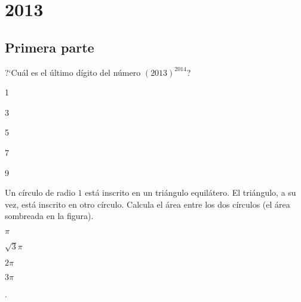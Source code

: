 \chapter{2013}
\label{cha:2013}

\section{Primera parte}
\label{sec:primera-parte2013}

\begin{Problema}{1}
  ?`Cu\'al es el \'ultimo d\'igito del n\'umero $(2013)^{2014}$?

  \begin{inparaenum}
  \item 1 \espl
  \item 3 \espl
  \item 5 \espl
  \item 7 \espl
  \item 9
  \end{inparaenum}
\end{Problema}

\begin{Problema}{2}
  Un c\'irculo de radio $1$ est\'a inscrito en un tri\'angulo
  equil\'atero. El tri\'angulo, a su vez, est\'a ins\-cri\-to en otro
  c\'irculo.  Calcula el \'area entre los dos c\'irculos (el \'area
  sombreada en la figura).

  \begin{inparaenum}
  \item $\pi$ \espm
  \item $\sqrt{3} \pi$ \espm
  \item $2 \pi$ \espm
  \item $3 \pi$ \espm
  \item \nota.
  \end{inparaenum}

\end{Problema}

